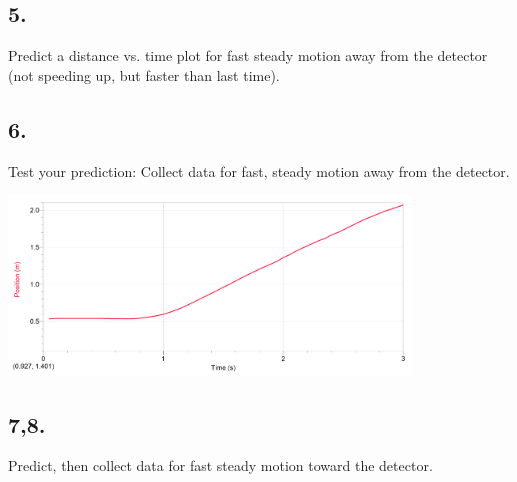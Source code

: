     \subsection*{5.}
    Predict a distance vs. time plot for fast steady motion away from the detector (not speeding up, but faster than last time).

    \begin{mdframed}
        \centering{}
    \end{mdframed}

    \pagebreak

    \subsection*{6.}
    Test your prediction: Collect data for fast, steady motion away from the detector. 

    \begin{mdframed}
        \centering\includegraphics[width=0.8\textwidth]{image4.png}
    \end{mdframed}

    \subsection*{7,8.}
    Predict, then collect data for fast steady motion toward the detector.

